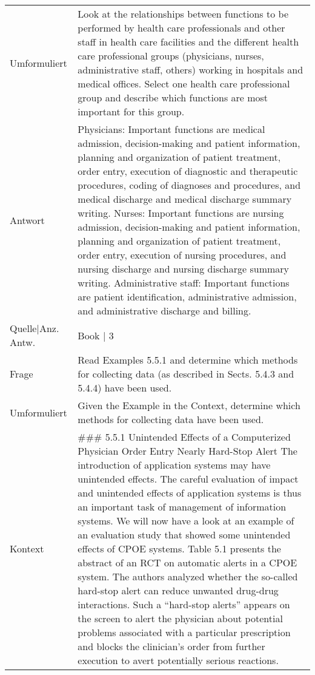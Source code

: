 {\begin{landscape}
\begin{longtable}{p{3cm}p{}}
    Umformuliert & Look at the relationships between functions to be performed by health care professionals and other staff in health care facilities and the different health care professional groups (physicians, nurses, administrative staff, others) working in hospitals and medical offices.
    Select one health care professional group and describe which functions are most important for this group.\\
    Antwort & Physicians: Important functions are medical admission, decision-making and patient information, planning and organization of patient treatment, order entry, execution of diagnostic and therapeutic procedures, coding of diagnoses and procedures, and medical discharge and medical discharge summary writing.
    Nurses: Important functions are nursing admission, decision-making and patient information, planning and organization of patient treatment, order entry, execution of nursing procedures, and nursing discharge and nursing discharge summary writing.
    Administrative staff: Important functions are patient identification, administrative admission, and administrative discharge and billing.\\
    Quelle|Anz. Antw. &  Book  | 3 \\
    \midrule
    Frage & Read Examples 5.5.1 and determine which methods for collecting data (as described in Sects. 5.4.3 and 5.4.4) have been used.\\
    Umformuliert & Given the Example in the Context, determine which methods for collecting data have been used.\\
    Kontext & \#\#\# 5.5.1 Unintended Effects of a Computerized Physician Order Entry Nearly Hard-Stop Alert
    The introduction of application systems may have unintended effects.
    The careful evaluation of impact and unintended effects of application systems is thus an important task of management of information systems.
    We will now have a look at an example of an evaluation study that showed some unintended effects of CPOE systems.
    Table 5.1 presents the abstract of an RCT on automatic alerts in a CPOE system.
    The authors analyzed whether the so-called hard-stop alert can reduce unwanted drug-drug interactions.
    Such a ``hard-stop alerts'' appears on the screen to alert the physician about potential problems associated with a particular prescription and blocks the clinician's order from further execution to avert potentially serious reactions.


\end{longtable}
\end{landscape}}
